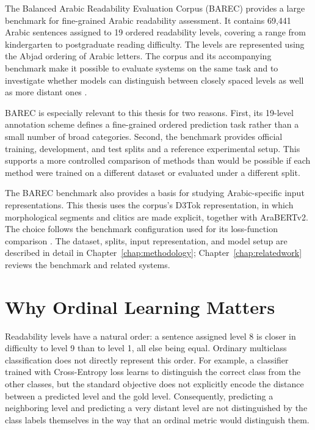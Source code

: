 \documentclass[12pt]{report}
\begin{document}
The Balanced Arabic Readability Evaluation Corpus (BAREC) provides a large benchmark for fine-grained Arabic readability assessment. It contains 69,441 Arabic sentences assigned to 19 ordered readability levels, covering a range from kindergarten to postgraduate reading difficulty. The levels are represented using the Abjad ordering of Arabic letters. The corpus and its accompanying benchmark make it possible to evaluate systems on the same task and to investigate whether models can distinguish between closely spaced levels as well as more distant ones \cite{elmadani2025barec}.

BAREC is especially relevant to this thesis for two reasons. First, its 19-level annotation scheme defines a fine-grained ordered prediction task rather than a small number of broad categories. Second, the benchmark provides official training, development, and test splits and a reference experimental setup. This supports a more controlled comparison of methods than would be possible if each method were trained on a different dataset or evaluated under a different split.

The BAREC benchmark also provides a basis for studying Arabic-specific input representations. This thesis uses the corpus's D3Tok representation, in which morphological segments and clitics are made explicit, together with AraBERTv2. The choice follows the benchmark configuration used for its loss-function comparison \cite{elmadani2025barec}. The dataset, splits, input representation, and model setup are described in detail in Chapter~\ref{chap:methodology}; Chapter~\ref{chap:relatedwork} reviews the benchmark and related systems.

\section{Why Ordinal Learning Matters}

Readability levels have a natural order: a sentence assigned level 8 is closer in difficulty to level 9 than to level 1, all else being equal. Ordinary multiclass classification does not directly represent this order. For example, a classifier trained with Cross-Entropy loss learns to distinguish the correct class from the other classes, but the standard objective does not explicitly encode the distance between a predicted level and the gold level. Consequently, predicting a neighboring level and predicting a very distant level are not distinguished by the class labels themselves in the way that an ordinal metric would distinguish them.
\end{document}
